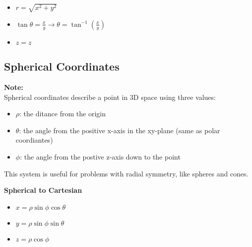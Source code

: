 \documentclass[10pt]{article}                               %
\begin{document}
\begin{defaultbox}
\begin{adjustwidth}{2em}{0pt}
\begin{adjustwidth}{2em}{0pt}
            \begin{itemize}
                \item \( r = \sqrt{x^2 + y^2} \)
                \item \( \tan\theta = \frac{x}{y}  \rightarrow  \theta = \tan^{-1}\left(\frac{x}{y}\right) \)
                \item \( z = z \)
            \end{itemize}

        \end{adjustwidth}


        \subsection*{Spherical Coordinates}

        \begin{adjustwidth}{2em}{0pt}

            \begin{notebox}

                \textbf{Note:} \\
                Spherical coordinates describe a point in 3D space using three values:
                        
                \begin{itemize}
                    \item \( \rho \): the ditance from the origin
                    \item \( \theta \): the angle from the positive x-axis in the xy-plane (same as polar coordiantes)
                    \item \( \phi \): the angle from the postive z-axis down to the point
                \end{itemize}

                This system is useful for problems with radial symmetry, like spheres and cones.

            \end{notebox}

            \vspace{0.5em}

            \textbf{Spherical to Cartesian}

                \begin{itemize}
                    \item \( x = \rho\sin\phi\cos\theta \)
                    \item \( y = \rho\sin\phi\sin\theta \)
                    \item \( z = \rho\cos\phi \)
                \end{itemize}


\end{adjustwidth}
\end{adjustwidth}
\end{defaultbox}
\end{document}

